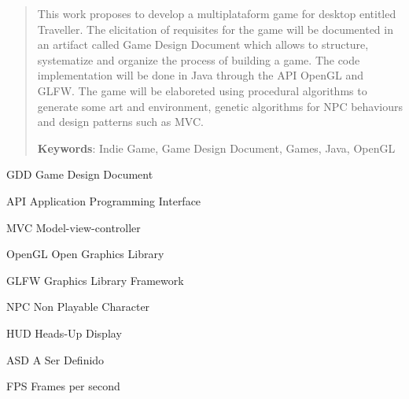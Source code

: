\documentclass[12pt, 
openright, 
oneside, 
a4paper,    
brazil]{facom-ufu-abntex2}
\begin{document}
\begin{abstract} 
This work proposes to develop a multiplataform game for desktop entitled Traveller. The elicitation of requisites for the game will be documented in an artifact called Game Design Document which allows to structure, systematize and organize the process of building a game. The code implementation will be done in Java through the API OpenGL and GLFW.  The game will be elaboreted using procedural algorithms to generate some art and environment, genetic algorithms for NPC behaviours and design patterns such as MVC.

 \vspace{\onelineskip}
    
 \noindent
 \textbf{Keywords}: Indie Game, Game Design Document, Games, Java, OpenGL %
\end{abstract}
\cleardoublepage


\listoffigures*
\cleardoublepage


\listoftables*
\cleardoublepage


\begin{siglas} 
  \item[GDD] Game Design Document 
  \item[API] Application Programming Interface
  \item[MVC] Model-view-controller
  \item[OpenGL] Open Graphics Library
  \item[GLFW] Graphics Library Framework
  \item[NPC] Non Playable Character
  \item[HUD] Heads-Up Display
  \item[ASD] A Ser Definido
  \item[FPS] Frames per second
\end{siglas}


\tableofcontents*
\cleardoublepage




\end{document}
